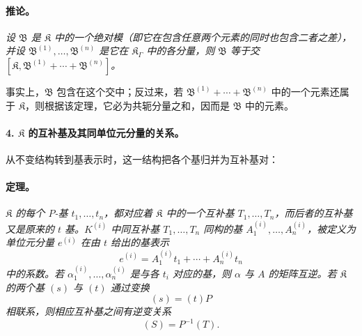 \paragraph{推论。}
\emph{设 $\mathfrak B$ 是 $\mathfrak K$ 中的一个绝对模（即它在包含任意两个元素的同时也包含二者之差），并设 $\mathfrak B^{(1)},\ldots,\mathfrak B^{(n)}$ 是它在 $\mathfrak K_\Gamma$ 中的各分量，则 $\mathfrak B$ 等于交 $[\mathfrak K,\mathfrak B^{(1)}+\cdots+\mathfrak B^{(n)}]$。}

事实上，$\mathfrak B$ 包含在这个交中；反过来，若 $\mathfrak B^{(1)}+\cdots+\mathfrak B^{(n)}$ 中的一个元素还属于 $\mathfrak K$，则根据该定理，它必为共轭分量之和，因而是 $\mathfrak B$ 中的元素。

\paragraph{4. $\mathfrak K$ 的互补基及其同单位元分量的关系。}
从不变结构转到基表示时，这一结构把各个基归并为互补基对：

\paragraph{定理。}
\emph{$\mathfrak K$ 的每个 $P$-基 $t_1,\ldots,t_n$，都对应着 $\mathfrak K$ 中的一个互补基 $T_1,\ldots,T_n$，而后者的互补基又是原来的 $t$ 基。$K^{(i)}$ 中同互补基 $T_1,\ldots,T_n$ 同构的基 $A_1^{(i)},\ldots,A_n^{(i)}$，被定义为单位元分量 $e^{(i)}$ 在由 $t$ 给出的基表示
\[
e^{(i)}=A_1^{(i)}t_1+\cdots+A_n^{(i)}t_n
\]
中的系数。若 $\alpha_1^{(i)},\ldots,\alpha_n^{(i)}$ 是与各 $t_i$ 对应的基，则 $\alpha$ 与 $A$ 的矩阵互逆。若 $\mathfrak K$ 的两个基 $(s)$ 与 $(t)$ 通过变换
\[
(s)=(t)P
\]
相联系，则相应互补基之间有逆变关系
\[
(S)=P^{-1}(T).
\]}

